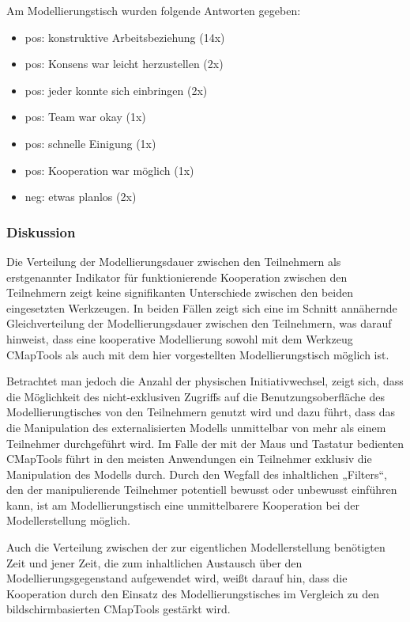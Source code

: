 Am Modellierungstisch wurden folgende Antworten gegeben:
\begin{itemize}
	\item pos: konstruktive Arbeitsbeziehung (14x) 
	\item pos: Konsens war leicht herzustellen (2x)
	\item pos: jeder konnte sich einbringen (2x) 
	\item pos: Team war okay (1x) 
	\item pos: schnelle Einigung (1x)
	\item pos: Kooperation war möglich (1x)
	\item neg: etwas planlos (2x)
\end{itemize}

\subsubsection{Diskussion} %

Die Verteilung der Modellierungsdauer zwischen den Teilnehmern als erstgenannter Indikator für funktionierende Kooperation zwischen den Teilnehmern zeigt keine signifikanten Unterschiede zwischen den beiden eingesetzten Werkzeugen. In beiden Fällen zeigt sich eine im Schnitt annähernde Gleichverteilung der Modellierungsdauer zwischen den Teilnehmern, was darauf hinweist, dass eine kooperative Modellierung sowohl mit dem Werkzeug CMapTools als auch mit dem hier vorgestellten Modellierungstisch möglich ist.

Betrachtet man jedoch die Anzahl der physischen Initiativwechsel, zeigt sich, dass die Möglichkeit des nicht-exklusiven Zugriffs auf die Benutzungsoberfläche des Modellierungtisches von den Teilnehmern genutzt wird und dazu führt, dass das die Manipulation des externalisierten Modells unmittelbar von mehr als einem Teilnehmer durchgeführt wird. Im Falle der mit der Maus und Tastatur bedienten CMapTools führt in den meisten Anwendungen ein Teilnehmer exklusiv die Manipulation des Modells durch. Durch den Wegfall des inhaltlichen „Filters“, den der manipulierende Teilnehmer potentiell bewusst oder unbewusst einführen kann, ist am Modellierungstisch eine unmittelbarere Kooperation bei der Modellerstellung möglich.

Auch die Verteilung zwischen der zur eigentlichen Modellerstellung benötigten Zeit und jener Zeit, die zum inhaltlichen Austausch über den Modellierungsgegenstand aufgewendet wird, weißt darauf hin, dass die Kooperation durch den Einsatz des Modellierungstisches im Vergleich zu den bildschirmbasierten CMapTools gestärkt wird.

